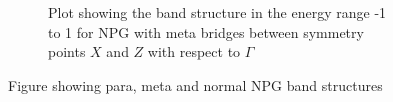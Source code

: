 \begin{figure}
\begin{subfigure}[b]{0.3\textwidth}
        \caption{Plot showing the band structure in the energy range -1 to 1 for NPG with meta bridges between symmetry points \(X\) and \(Z\) with respect to \(\Gamma\)}
        \label{metabs}
    \end{subfigure}
    \caption{Figure showing para, meta and normal NPG band structures}\label{allbands}
\end{figure}
